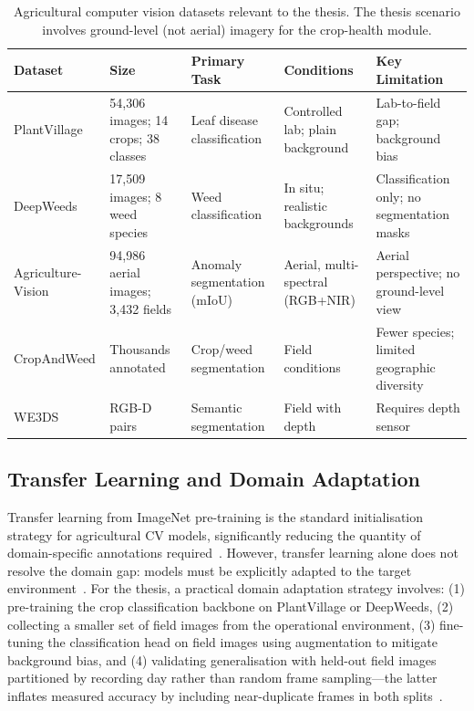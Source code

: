 \documentclass[12pt, a4paper]{article}
\begin{document}
\begin{table}[htbp]
\centering
\caption{Agricultural computer vision datasets relevant to the thesis. The thesis scenario involves ground-level (not aerial) imagery for the crop-health module.}
\label{tab:datasets}
\begin{tabularx}{\textwidth}{X X X X X}
\toprule
\textbf{Dataset} & \textbf{Size} & \textbf{Primary Task} & \textbf{Conditions} & \textbf{Key Limitation} \\
\midrule
PlantVillage \cite{ref157, ref159} & 54,306 images; 14 crops; 38 classes & Leaf disease classification & Controlled lab; plain background & Lab-to-field gap; background bias \cite{ref154, ref203} \\
\addlinespace
DeepWeeds \cite{ref167, ref168} & 17,509 images; 8 weed species & Weed classification & In situ; realistic backgrounds & Classification only; no segmentation masks \cite{ref170, ref175} \\
\addlinespace
Agriculture-Vision \cite{ref191, ref194} & 94,986 aerial images; 3,432 fields & Anomaly segmentation (mIoU) & Aerial, multi-spectral (RGB+NIR) & Aerial perspective; no ground-level view \\
\addlinespace
CropAndWeed \cite{ref169, ref176} & Thousands annotated & Crop/weed segmentation & Field conditions & Fewer species; limited geographic diversity \\
\addlinespace
WE3DS \cite{ref169, ref176} & RGB-D pairs & Semantic segmentation & Field with depth & Requires depth sensor \\
\bottomrule
\end{tabularx}
\end{table}

\subsection{Transfer Learning and Domain Adaptation}

Transfer learning from ImageNet pre-training is the standard initialisation strategy for
agricultural CV models, significantly reducing the quantity of domain-specific annotations
required~\cite{ref160, ref208}. However, transfer learning alone does not resolve the
domain gap: models must be explicitly adapted to the target environment~\cite{ref150, ref154}.
For the thesis, a practical domain adaptation strategy involves: (1) pre-training the crop
classification backbone on PlantVillage or DeepWeeds, (2) collecting a smaller set of
field images from the operational environment, (3) fine-tuning the classification head on
field images using augmentation to mitigate background bias, and (4) validating
generalisation with held-out field images partitioned by recording day rather than random
frame sampling---the latter inflates measured accuracy by including near-duplicate frames
in both splits~\cite{ref2, ref154, ref209}.
\end{document}
